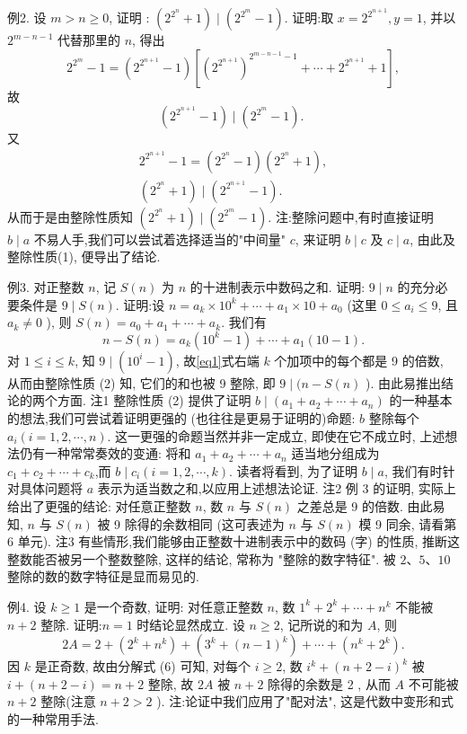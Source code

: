 例2. 设 $m>n \geqslant 0$, 证明 : $\left(2^{2^n}+1\right) \mid\left(2^{2^m}-1\right)$.
证明:取 $x=2^{2^{n+1}}, y=1$, 并以 $2^{m-n-1}$ 代替那里的 $n$, 得出
$$
2^{2^m}-1=\left(2^{2^{n+1}}-1\right)\left[\left(2^{2^{n+1}}\right)^{2^{m-n-1}-1}+\cdots+2^{2^{n+1}}+1\right],
$$
故
$$
\left(2^{2^{n+1}}-1\right) \mid\left(2^{2^m}-1\right) \text {. }
$$
又
$$
\begin{gathered}
2^{2^{n+1}}-1=\left(2^{2^n}-1\right)\left(2^{2^n}+1\right), \\
\left(2^{2^n}+1\right) \mid\left(2^{2^{n+1}}-1\right) .
\end{gathered}
$$
从而于是由整除性质知 $\left(2^{2^n}+1\right) \mid\left(2^{2^m}-1\right)$.
注:整除问题中,有时直接证明 $b \mid a$ 不易人手,我们可以尝试着选择适当的"中间量" $c$, 来证明 $b \mid c$ 及 $c \mid a$, 由此及整除性质(1), 便导出了结论.



例3. 对正整数 $n$, 记 $S(n)$ 为 $n$ 的十进制表示中数码之和.
证明: $9 \mid n$ 的充分必要条件是 $9 \mid S(n)$.
证明:设 $n=a_k \times 10^k+\cdots+a_1 \times 10+a_0$ (这里 $0 \leqslant a_i \leqslant 9$, 且 $a_k \neq 0$ ), 则 $S(n)=a_0+a_1+\cdots+a_k$. 我们有
$$
n-S(n)=a_k\left(10^k-1\right)+\cdots+a_1(10-1) . \label{eq1}
$$
对 $1 \leqslant i \leqslant k$,  知 $9 \mid\left(10^i-1\right)$, 故\ref{eq1}式右端 $k$ 个加项中的每个都是 9 的倍数, 从而由整除性质 (2) 知, 它们的和也被 9 整除, 即 $9 \mid(n- S(n)$ ). 由此易推出结论的两个方面.
注1 整除性质 (2) 提供了证明 $b \mid\left(a_1+a_2+\cdots+a_n\right)$ 的一种基本的想法,我们可尝试着证明更强的 (也往往是更易于证明的)命题:
$b$ 整除每个 $a_i(i=1,2, \cdots, n)$.
这一更强的命题当然并非一定成立, 即使在它不成立时, 上述想法仍有一种常常奏效的变通: 将和 $a_1+a_2+\cdots+a_n$ 适当地分组成为 $c_1+c_2+\cdots+c_k$,而 $b \mid c_i(i=1,2, \cdots, k)$. 读者将看到, 为了证明 $b \mid a$, 我们有时针对具体问题将 $a$ 表示为适当数之和,以应用上述想法论证.
注2 例 3 的证明, 实际上给出了更强的结论: 对任意正整数 $n$, 数 $n$ 与 $S(n)$ 之差总是 9 的倍数.
由此易知, $n$ 与 $S(n)$ 被 9 除得的余数相同 (这可表述为 $n$ 与 $S(n)$ 模 9 同余, 请看第 6 单元).
注3 有些情形,我们能够由正整数十进制表示中的数码 (字) 的性质, 推断这整数能否被另一个整数整除, 这样的结论, 常称为 "整除的数字特征". 被 $2 、 5 、 10$ 整除的数的数字特征是显而易见的.



例4. 设 $k \geqslant 1$ 是一个奇数, 证明: 对任意正整数 $n$, 数 $1^k+2^k+\cdots+n^k$ 不能被 $n+2$ 整除.
证明:$n=1$ 时结论显然成立.
设 $n \geqslant 2$, 记所说的和为 $A$, 则
$$
2 A=2+\left(2^k+n^k\right)+\left(3^k+(n-1)^k\right)+\cdots+\left(n^k+2^k\right) .
$$
因 $k$ 是正奇数, 故由分解式 (6) 可知, 对每个 $i \geqslant 2$, 数 $i^k+(n+2-i)^k$ 被 $i+(n+2-i)=n+2$ 整除, 故 $2 A$ 被 $n+2$ 除得的余数是 2 , 从而 $A$ 不可能被 $n+2$ 整除(注意 $n+2>2$ ).
注:论证中我们应用了"配对法", 这是代数中变形和式的一种常用手法.




